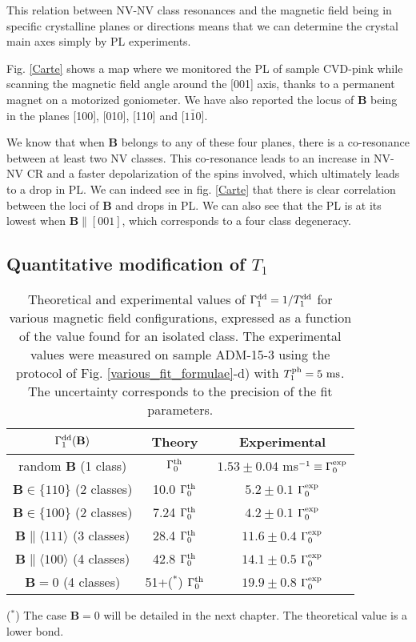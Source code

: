 \documentclass[a4paper, 11pt]{report}
\begin{document}
This relation between NV-NV class resonances and the magnetic field being in specific crystalline planes or directions means that we can determine the crystal main axes simply by PL experiments.

Fig. \ref{Carte} shows a map where we monitored the PL of sample CVD-pink while scanning the magnetic field angle around the [001] axis, thanks to a permanent magnet on a motorized goniometer. We have also reported the locus of $\mathbf{B}$ being in the planes [100], [010], [110] and [$1\bar 1 0$].

We know that when $\mathbf{B}$ belongs to any of these four planes, there is a co-resonance between at least two NV classes. This co-resonance leads to an increase in NV-NV CR and a faster depolarization of the spins involved, which ultimately leads to a drop in PL. We can indeed see in fig. \ref{Carte} that there is clear correlation between the loci of $\mathbf{B}$ and drops in PL. We can also see that the PL is at its lowest when $\mathbf{B}\parallel [001]$, which corresponds to a four class degeneracy.

\subsection{Quantitative modification of $T_1$}
\label{sec quantitative T1}
\begin{table}[htbp]
\centering
\caption{Theoretical and experimental values of $\Gamma_1^{\rm dd}=1/T_1^{\rm dd}$ for various magnetic field configurations, expressed as a function of the value found for an isolated class. The experimental values were measured on sample ADM-15-3 using the protocol of Fig. \ref{various_fit_formulae}-d) with $T_1^{\rm ph}= 5\ \rm ms$. The uncertainty corresponds to the precision of the fit parameters.}
 \label{T1 champ mag}
\begin{tabular}{c|cc}
\toprule
$\Gamma_1^{\rm dd} (\mathbf{B})$ &  Theory & Experimental \\
\midrule
random $\mathbf{B}$ (1 class) & $\Gamma_0^{\rm th}$ & $1.53\pm 0.04$ ms$^{-1} \equiv \Gamma_0^{\rm exp}$ \\
$\mathbf{B} \in \{110\}$ (2 classes) & 10.0 $\Gamma_0^{\rm th}$ & $5.2 \pm 0.1$ $\Gamma_0^{\rm exp}$ \\
$\mathbf{B} \in \{100\}$ (2 classes) & 7.24 $\Gamma_0^{\rm th}$ & $4.2 \pm 0.1$ $\Gamma_0^{\rm exp}$ \\
$\mathbf{B} \parallel \langle 111 \rangle$ (3 classes) & 28.4 $\Gamma_0^{\rm th}$ & $11.6 \pm 0.4$ $\Gamma_0^{\rm exp}$ \\
$\mathbf{B} \parallel \langle 100 \rangle$ (4 classes) & 42.8 $\Gamma_0^{\rm th}$ & $14.1 \pm 0.5$ $\Gamma_0^{\rm exp}$ \\
$\mathbf{B}=0$ (4 classes) & 51+($^*$) $\Gamma_0^{\rm th}$ & $19.9 \pm 0.8$ $\Gamma_0^{\rm exp}$ \\
\bottomrule
\end{tabular}

($^*$) The case $\mathbf{B}=0$ will be detailed in the next chapter. The theoretical value is a lower bond.
\end{table}
\end{document}
